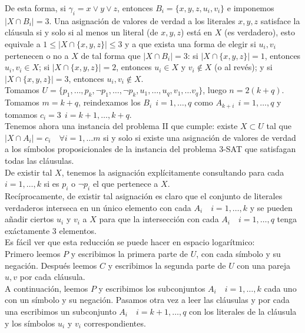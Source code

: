 \documentclass{article}
\begin{document}
De esta forma, si $\gamma_i=x\vee y\vee z$, entonces
$B_i=\{x,y,z,u_i,v_i\}$ e imponemos $|X\cap B_i|=3$. Una asignación de
valores de verdad a los literales $x,y,z$ satisface la cláusula si y
solo si al menos un literal (de $x,y,z$) está en $X$ (es verdadero),
esto equivale a $1\leq|X\cap\{x,y,z\}|\leq 3$ y a que exista una forma
de elegir si $u_i,v_i$ pertenecen o no a $X$ de tal forma que
$|X\cap B_i|=3$: si $|X\cap\{x,y,z\}|=1$, entonces $u_i,v_i\in X$; si
$|X\cap\{x,y,z\}|=2$, entonces $u_i\in X$ y $v_i\notin X$ (o al
revés); y
si $|X\cap\{x,y,z\}|=3$, entonces $u_i,v_i\notin X$. \\

Tomamos
$U=\{p_1,\ldots,p_k,\neg p_1,\ldots,\neg p_k,u_1,\ldots,u_q,v_1,\ldots
v_q\}$, luego $n=2(k+q)$. Tomamos $m=k+q$, reindexamos los
$B_i\ \ i=1,\ldots,q$ como $A_{k+i}\ \ i=1,\ldots,q$ y tomamos
$c_i=3\ \ i=k+1,\ldots,k+q$.\\

Tenemos ahora una instancia del problema II que cumple: existe
$X\subset U$ tal que $|X\cap A_i|=c_i\quad\forall i = 1,\ldots m$ si y
solo si existe una asignación de valores de verdad a los símbolos
proposicionales de la instancia del problema 3-SAT que satisfagan
todas las cláusulas. \\

De existir tal $X$, tenemos la asignación explícitamente consultando
para cada $i=1,\ldots,k$ si es $p_i$ o $\neg p_i$ el que pertenece a
$X$. \\

Recíprocamente, de existir tal asignación es claro que el conjunto de
literales verdaderos interseca en un único elemento con cada
$A_i\quad i=1,\ldots,k$ y se pueden añadir ciertos $u_i$ y $v_i$ a $X$
para que la intersección con cada $A_{i}\quad i=1,\ldots,q$ tenga
exáctamente 3 elementos. \\

Es fácil ver que esta reducción se puede hacer en espacio logarítmico: \\

Primero leemos $P$ y escribimos la primera parte de $U$, con cada
símbolo y su negación. Después leemos $C$ y escribimos la segunda
parte de $U$ con una pareja $u,v$ por cada cláusula. \\

A continuación, leemos $P$ y escribimos los subconjuntos
$A_i\quad i=1,\ldots,k$ cada uno con un símbolo y su negación. Pasamos
otra vez a leer las cláusulas y por cada una escribimos un subconjunto
$A_i\quad i=k+1,\ldots,q$ con los literales de la cláusula y los
símbolos $u_i$ y $v_i$ correspondientes. \\
\end{document}
